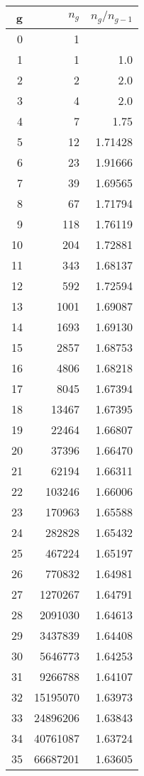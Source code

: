 \documentclass[reqno,11pt]{amsart}
\theoremstyle{plain}
\theoremstyle{definition}
\begin{document}
\begin{minipage}{0.5\textwidth}
\begin{tabular}{|r|r|r|}
\hline
g & $n_g$ & $n_g/n_{g-1}$\\
\hline
0 & 1 &  \\
1 & 1 & 1.0 \\
2 & 2 & 2.0 \\
3 & 4 & 2.0 \\
4 & 7 & 1.75 \\
5 & 12 & 1.71428 \\
6 & 23 & 1.91666 \\
7 & 39 & 1.69565 \\
8 & 67 & 1.71794 \\
9 & 118 & 1.76119 \\
10 & 204 & 1.72881 \\
11 & 343 & 1.68137 \\
12 & 592 & 1.72594 \\
13 & 1001 & 1.69087 \\
14 & 1693 & 1.69130 \\
15 & 2857 & 1.68753 \\
16 & 4806 & 1.68218 \\
17 & 8045 & 1.67394 \\
18 & 13467 & 1.67395 \\
19 & 22464 & 1.66807 \\
20 & 37396 & 1.66470 \\
21 & 62194 & 1.66311 \\
22 & 103246 & 1.66006 \\
23 & 170963 & 1.65588 \\
24 & 282828 & 1.65432 \\
25 & 467224 & 1.65197 \\
26 & 770832 & 1.64981 \\
27 & 1270267 & 1.64791 \\
28 & 2091030 & 1.64613 \\
29 & 3437839 & 1.64408 \\
30 & 5646773 & 1.64253 \\
31 & 9266788 & 1.64107 \\
32 & 15195070 & 1.63973 \\
33 & 24896206 & 1.63843 \\
34 & 40761087 & 1.63724 \\
35 & 66687201 & 1.63605 \\
\hline
\end{tabular}
\end{minipage}
\end{document}
